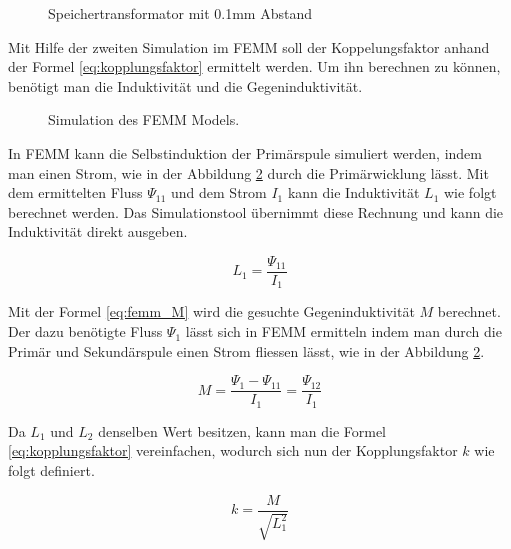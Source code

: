 \begin{figure}[h]
	\centering
	\qquad
	\caption{Speichertransformator mit 0.1mm Abstand}
	\label{fig:saettigung}
\end{figure}
\newpage

Mit Hilfe der zweiten Simulation im FEMM soll der Koppelungsfaktor anhand der Formel \ref{eq:kopplungsfaktor} ermittelt werden. Um ihn berechnen zu können, benötigt man die Induktivität und die Gegeninduktivität.

\begin{figure}[H]
	\centering
	\qquad
	\caption{Simulation des FEMM Models.}
	\label{fig:femmkopplung}
\end{figure}

In FEMM kann die Selbstinduktion der Primärspule simuliert werden, indem man einen Strom, wie in der Abbildung \ref{fig:femmkopplung} durch die Primärwicklung lässt. Mit dem ermittelten Fluss $ \Psi_{11}  $ und dem Strom $ I_{1} $ kann die Induktivität $ L_{1} $ wie folgt berechnet werden. Das Simulationstool übernimmt diese Rechnung und kann die Induktivität direkt ausgeben.

\begin{equation}
L_{1}=\frac{\Psi_{11}}{I_{1}}
\label{eq:femm_l1}
\end{equation}

Mit der Formel \ref{eq:femm_M} wird die gesuchte Gegeninduktivität $ M $ berechnet.
Der dazu benötigte Fluss $ \Psi_{1} $ lässt sich in FEMM ermitteln indem man durch die Primär und Sekundärspule einen Strom fliessen lässt, wie in der Abbildung \ref{fig:femmkopplung}. 

\begin{equation}
M=\frac{\Psi_{1}-\Psi_{11}}{I_{1}}=\frac{\Psi_{12}}{I_{1}}
\label{eq:femm_M}
\end{equation}

Da $ L_{1} $ und $ L_{2} $ denselben Wert besitzen, kann man die Formel \ref{eq:kopplungsfaktor} vereinfachen, wodurch sich nun der Kopplungsfaktor $ k $ wie folgt definiert.

\begin{equation}
k=\frac{M}{\sqrt{L_{1}^{2}}}
\label{eq:kopplungsfaktor_neu}
\end{equation}

